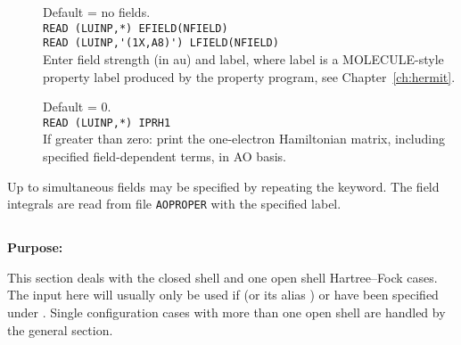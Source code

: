 \begin{description}
\item[]
  Default = no fields. \\
  \verb"READ (LUINP,*) EFIELD(NFIELD)" \\
  \verb"READ (LUINP,'(1X,A8)') LFIELD(NFIELD)" \\
  Enter field strength (in au) and label,
  where label is a MOLE\-CULE-style property label produced
  by the property program, see Chapter~\ref{ch:hermit}.


\item[]
  Default = 0.\\
  \verb"READ (LUINP,*) IPRH1" \\
  If greater than zero:
  print the one-electron Hamiltonian matrix, including
  specified field-dependent terms, in AO basis.
\end{description}


Up to \mxfelt simultaneous fields may be specified by repeating the
 keyword.
The field integrals are read from file \verb|AOPROPER| with the specified label.


\pagebreak[3]
\subsection{\label{ref-rhfinp}}

{\bf Purpose:}

This section deals with the closed shell and one open shell
Hartree--Fock cases.  The
input here will usually only be used if
 (or its alias ) or
have been specified under . Single configuration cases with more than one open
shell
are handled by the general  section.

